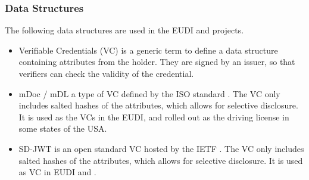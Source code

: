\subsubsection{Data Structures}

The following data structures are used in the EUDI and \swiyu projects.

\begin{itemize}
    \item Verifiable Credentials (VC) is a generic term to define a data structure containing attributes from the holder. 
    They are signed by an issuer, so that verifiers can check the validity of the credential.
    \item mDoc / mDL a type of VC defined by the ISO standard \cite{ISO18013-5_2021}.
    The VC only includes salted hashes of the attributes, which allows for selective disclosure.
    It is used as the VCs in the EUDI, and rolled out as the driving license in some states of the USA.
    \item SD-JWT is an open standard VC hosted by the IETF \cite{SDJWT}.
    The VC only includes salted hashes of the attributes, which allows for selective disclosure.
    It is used as VC in EUDI and \swiyu.
\end{itemize}


